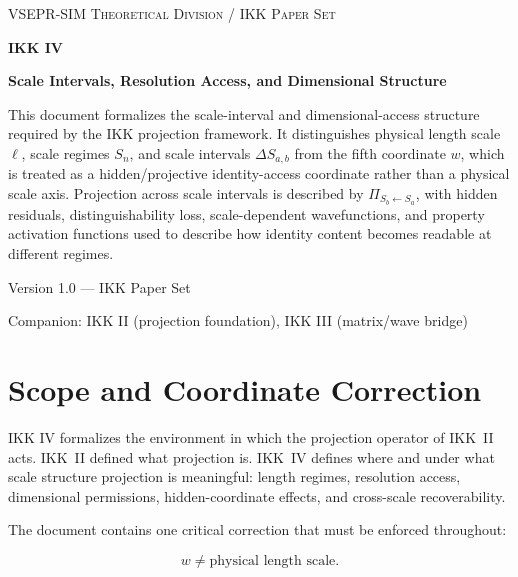 \documentclass[11pt,a4paper,oneside]{article}
\begin{document}
\begin{titlepage}
\centering
\vspace*{1.1cm}
{\large\scshape VSEPR-SIM Theoretical Division / IKK Paper Set\par}
\vspace{1.1cm}
{\Huge\bfseries IKK IV\par}
\vspace{0.35cm}
{\Large\bfseries Scale Intervals, Resolution Access, and Dimensional Structure\par}
\vspace{1.1cm}
{\normalsize
This document formalizes the scale-interval and dimensional-access structure required
by the IKK projection framework. It distinguishes physical length scale $\ell$,
scale regimes $S_n$, and scale intervals $\Delta S_{a,b}$ from the fifth coordinate
$w$, which is treated as a hidden/projective identity-access coordinate rather than
a physical scale axis. Projection across scale intervals is described by
$\Pi_{S_b \leftarrow S_a}$, with hidden residuals, distinguishability loss,
scale-dependent wavefunctions, and property activation functions used to describe
how identity content becomes readable at different regimes.
\par}
\vfill
{\large Version 1.0 \quad --- \quad IKK Paper Set\par}
{\large Companion: IKK II (projection foundation), IKK III (matrix/wave bridge)\par}
\end{titlepage}

\tableofcontents
\clearpage

\section{Scope and Coordinate Correction}

IKK IV formalizes the environment in which the projection operator of IKK~II acts. IKK~II defined what projection is. IKK~IV defines where and under what scale structure projection is meaningful: length regimes, resolution access, dimensional permissions, hidden-coordinate effects, and cross-scale recoverability.

The document contains one critical correction that must be enforced throughout:

\[
\boxed{w \neq \text{physical length scale.}}
\]
\end{document}

